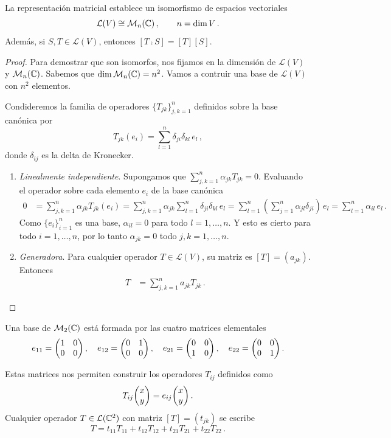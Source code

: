 \begin{theo}
  La representación matricial establece un isomorfismo de espacios vectoriales
  \[
    \mathcal{L}(V)\cong\mathcal{M}_n(\mathbb{C})\,,\qquad n=\dim V\,.
  \]
  Además, si $S,T\in\mathcal{L}(V)$, entonces $[T\comp S]=[T][S]$.
\end{theo}
\begin{proof}
  Para demostrar que son isomorfos, nos fijamos en la dimensión de $\mathcal{L}(V)$ y $\mathcal{M}_n(\mathbb{C})$. Sabemos que $\dim\mathcal{M}_n(\mathbb{C})=n^2$. Vamos a contruir una base de $\mathcal{L}(V)$ con $n^2$ elementos.

  Condideremos la familia de operadores $\{T_{jk}\}_{j,k=1}^n$ definidos sobre la base canónica por
  \[
    T_{jk}(e_i) = \sum_{l=1}^n\delta_{ji}\delta_{kl}\,e_l\,,
  \]
  donde $\delta_{ij}$ es la delta de Kronecker.

  \begin{enumerate}
    \item \textit{Linealmente independiente}. Supongamos que $\sum_{j,k=1}^n \alpha_{jk} T_{jk}=0$. Evaluando el operador sobre cada elemento $e_i$ de la base canónica
          \begin{align*}
            0 & = \sum_{j,k=1}^n \alpha_{jk} T_{jk}(e_i) = \sum_{j,k=1}^n \alpha_{jk} \sum_{l=1}^n\delta_{ji}\delta_{kl}\,e_l = \sum_{l=1}^n \left(\sum_{j=1}^n \alpha_{jl}\delta_{ji}\right)\,e_l = \sum_{l=1}^n \alpha_{il}\,e_l\,.
          \end{align*}
          Como $\{e_i\}_{i=1}^n$ es una base, $\alpha_{il}=0$ para todo $l=1,\ldots,n$. Y esto es cierto para todo $i=1,\ldots,n$, por lo tanto $\alpha_{jk}=0$ todo $j,k=1,\ldots,n$.

    \item \textit{Generadora}. Para cualquier operador $T\in\mathcal{L}(V)$, su matriz es $[T]=(a_{jk})$. Entonces
          \begin{align*}
            T & = \sum_{j,k=1}^n a_{jk} T_{jk}\,.
          \end{align*}
  \end{enumerate}
\end{proof}

\begin{eje}
  Una base de $\mathcal{M}_2(\mathbb{C})$ está formada por las cuatro matrices elementales
  \[
    e_{11}=\mqty(1&0\\0&0)\,,\quad e_{12}=\mqty(0&1\\0&0)\,,\quad e_{21}=\mqty(0&0\\1&0)\,,\quad e_{22}=\mqty(0&0\\0&1)\,.
  \]

  Estas matrices nos permiten construir los operadores $T_{ij}$ definidos como
  \[
    T_{ij}\mqty(x\\y) = e_{ij}\mqty(x\\y)\,.
  \]
  Cualquier operador $T\in\mathcal{L}(\mathbb{C}^2)$ con matriz $[T]=(t_{jk})$ se escribe
  \[
    T = t_{11}T_{11}+t_{12}T_{12}+t_{21}T_{21}+t_{22}T_{22}\,.
  \]
\end{eje}

